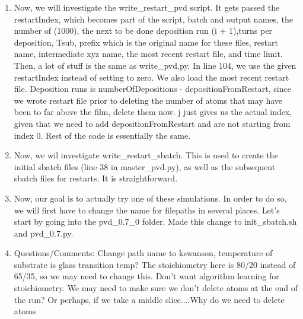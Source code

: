 \documentclass[12pt,reqno]{amsart}
\numberwithin{equation}{section}
\begin{document}
\begin{enumerate}
\item Now, we will investigate the write\_restart\_pvd script.  It gets passed the restartIndex, which becomes part of the script, batch and output names, the number of (1000), the next to be done deposition run (i + 1),turns per deposition, Tsub, prefix which is the original name for these files, restart name, intermediate xyz name, the most recent restart file, and time limit.  Then, a lot of stuff is the same as write\_pvd.py.  In line 104, we use the given restartIndex instead of setting to zero. We also load the most recent restart file.  Deposition runs is numberOfDepositions - depositionFromRestart, since we wrote restart file prior to deleting the number of atoms that may have been to far above the film, delete them now. j just gives us the actual index, given that we need to add depositionFromRestart and are not starting from index 0.  Rest of the code is essentially the same.
\item Now, we wil investigate write\_restart\_sbatch.  This is used to create the initial sbatch files (line 38 in master\_pvd.py), as well as the subsequent sbatch files for restarts.  It is straightforward.
\item Now, our goal is to actually try one of these simulations.  In order to do so, we will first have to change the name for filepaths in several places.  Let's start by going into the pvd\_0.7\_0 folder.  Made this change to init\_sbatch.sh and pvd\_0.7.py.  

\item Questions/Comments: Change path name to kswanson, temperature of substrate is glass transition temp? The stoichiometry here is 80/20 instead of 65/35, so we may need to change this.  Don't want algorithm learning for stoichiometry.   We may need to make sure we don't delete atoms at the end of the run?  Or perhaps, if we take a middle slice....Why do we need to delete atoms
 \end{enumerate}
\end{document}
